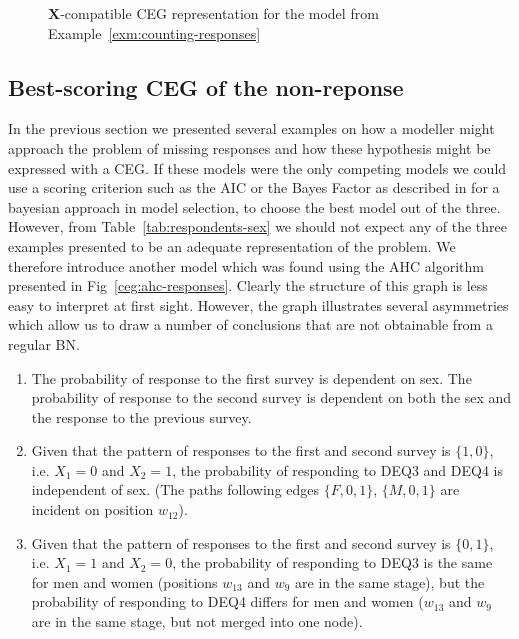 \documentclass[runningheads]{llncs}
\begin{document}
\begin{figure}
\centering

\vspace{1ex}
\caption{$\boldsymbol{X}$-compatible CEG representation for the  model from Example~\ref{exm:counting-responses}}
\label{ceg:counting-responses}
\end{figure}

\subsection{Best-scoring CEG of the non-reponse}\label{subsec:best-fit-dropout}
In the previous section we presented several examples on how a modeller might approach the problem of missing responses and how these hypothesis might be expressed with a CEG. If these models were the only competing models we could use a scoring criterion such as the AIC or the Bayes Factor as described in \cite{smith2017cegs} for a bayesian approach in model selection, to choose the best model out of the three. However, from Table~\ref{tab:respondents-sex} we should not expect any of the three examples presented to be an adequate representation of the problem. We therefore introduce another model which was found using the AHC algorithm presented in Fig~\ref{ceg:ahc-responses}. Clearly the structure of this graph is less easy to interpret at first sight. However, the graph illustrates several asymmetries which allow us to draw a number of conclusions that are not obtainable from a regular BN.
\begin{enumerate}[topsep=0pt]
    \item The probability of response to the first survey is dependent on sex. The probability of response to the second survey is dependent on both the sex and the response to the previous survey.
    \item Given that the pattern of responses to the first and second survey is $\{1, 0\}$, i.e. $X_1 = 0$ and $X_2 = 1$, the probability of responding to DEQ3 and DEQ4 is independent of sex. (The paths following edges $\{F, 0, 1\}$, $\{M, 0, 1\}$ are incident on position $w_{12}$).
    \item Given that the pattern of responses to the first and second survey is $\{0, 1\}$, i.e. $X_1 = 1$ and $X_2 = 0$, the probability of responding to DEQ3 is the same for men and women (positions $w_{13}$ and $w_{9}$ are in the same stage), but the probability of responding to DEQ4 differs for men and women ($w_{13}$ and $w_{9}$ are in the same stage, but not merged into one node).
\end{enumerate}
\end{document}
